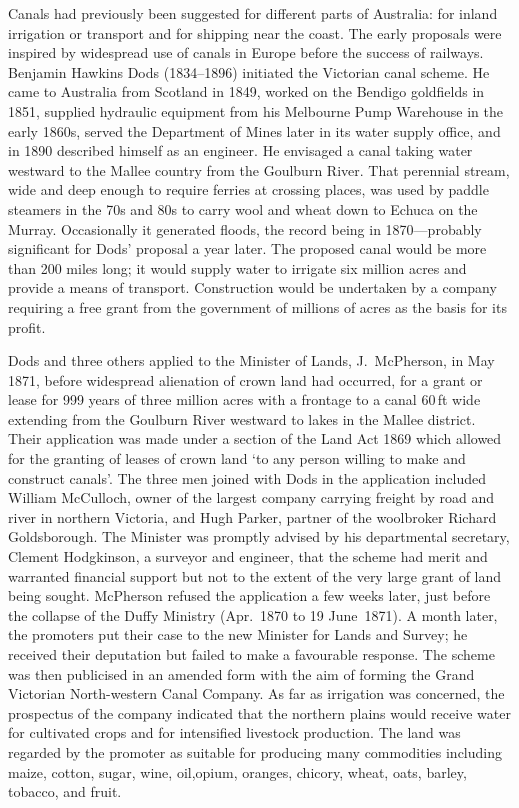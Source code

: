 Canals had previously been suggested for different parts of Australia:
for inland irrigation or transport and for shipping near the coast.
The early proposals were inspired by widespread use of canals in
Europe before the success of railways.  Benjamin Hawkins Dods
(1834--1896) initiated the Victorian canal scheme.  He came to
Australia from Scotland in 1849, worked on the Bendigo goldfields in
1851, supplied hydraulic equipment from his Melbourne Pump Warehouse
in the early 1860s, served the Department of Mines later in its water
supply office, and in 1890 described himself as an engineer.  He
envisaged a canal taking water westward to the Mallee country from the
Goulburn River. That perennial stream, wide and deep enough to require
ferries at crossing places, was used by paddle steamers in the 70s and
80s to carry wool and wheat down to Echuca on the Murray.
Occasionally it generated floods, the record being in 1870---probably
significant for Dods' proposal a year later.  The proposed canal would
be more than 200 miles long; it would supply water to irrigate six
million acres and provide a means of transport.  Construction would be
undertaken by a company requiring a free grant from the government of
millions of acres as the basis for its
profit.

Dods and three others applied to the Minister of Lands, J.~McPherson,
in May 1871, before widespread alienation of crown land had occurred,
for a grant or lease for 999 years of three million acres with a
frontage to a canal 60\,ft wide extending from the Goulburn River
westward to lakes in the Mallee district.  Their application was made
under a section of the Land Act 1869 which allowed for the granting of
leases of crown land `to any person willing to make and construct
canals'.  The three men joined with Dods in the application included
William McCulloch, owner of the largest company carrying freight by
road and river in northern Victoria, and Hugh Parker, partner of the
woolbroker Richard Goldsborough.  The Minister was promptly advised by
his departmental secretary, Clement Hodgkinson, a surveyor and
engineer, that the scheme had merit and warranted financial support
but not to the extent of the very large grant of land being sought.
McPherson refused the application a few weeks later, just before the
collapse of the Duffy Ministry (Apr.\ 1870 to 19 June~1871).  A month
later, the promoters put their case to the new Minister for Lands and
Survey; he received their deputation but failed to make a favourable
response.  The scheme was then publicised in an amended form with the
aim of forming the Grand Victorian North-western Canal Company.  As
far as irrigation was concerned, the prospectus of the company
indicated that the northern plains would receive water for cultivated
crops and for intensified livestock production.  The land was regarded
by the promoter as suitable for producing many commodities including
maize, cotton, sugar, wine, oil,opium, oranges, chicory, wheat, oats,
barley, tobacco, and fruit.


